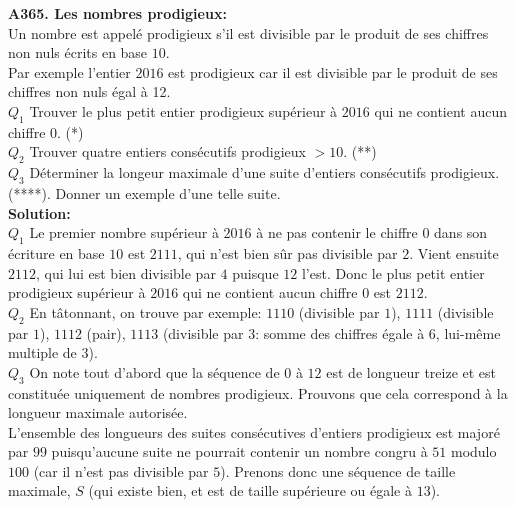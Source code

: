 \documentclass[11pt] {article}
\begin{document}



\textbf{A365. Les nombres prodigieux:}\\
Un nombre est appelé prodigieux s'il est divisible par le produit de ses chiffres non nuls écrits en base $10$.\\
Par exemple l'entier $2016$ est prodigieux car il est divisible par le produit de ses chiffres non nuls égal à 12.\\
$Q_{1}$ Trouver le plus petit entier prodigieux supérieur à $2016$ qui ne contient aucun chiffre $0$. (*)\\
$Q_{2}$ Trouver quatre entiers consécutifs prodigieux $> 10$. (**)\\
$Q_{3}$ Déterminer la longeur maximale d'une suite d'entiers consécutifs prodigieux. (****). Donner un exemple d'une telle suite.\\

\textbf{Solution:}\\
$Q_{1}$ Le premier nombre supérieur à $2016$ à ne pas contenir le chiffre $0$ dans son écriture en base $10$ est $2111$, qui n'est bien sûr pas divisible par $2$. Vient ensuite $2112$, qui lui est bien divisible par $4$ puisque $12$ l'est. Donc le plus petit entier prodigieux supérieur à $2016$ qui ne contient aucun chiffre $0$ est $2112$.\\

$Q_{2}$ En tâtonnant, on trouve par exemple: $1110$ (divisible par $1$), $1111$ (divisible par $1$), $1112$ (pair), $1113$ (divisible par $3$: somme des chiffres égale à $6$, lui-même multiple de $3$).\\

$Q_{3}$ On note tout d'abord que la séquence de $0$ à $12$ est de longueur treize et est constituée uniquement de nombres prodigieux. Prouvons que cela correspond à la longueur maximale autorisée.\\

L'ensemble des longueurs des suites consécutives d'entiers prodigieux est majoré par $99$ puisqu'aucune suite ne pourrait contenir un nombre congru à $51$ modulo $100$ (car il n'est pas divisible par $5$).
Prenons donc une séquence de taille maximale, $S$ (qui existe bien, et est de taille supérieure ou égale à $13$).\\
\end{document}
